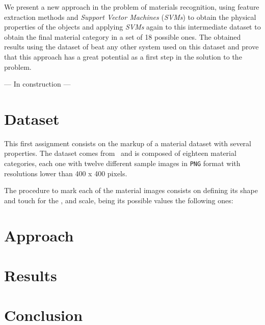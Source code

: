 \documentclass[12pt,a4paper]{article}
\begin{document}
\begin{singlespace}
We present a new approach in the problem of materials recognition, using feature extraction methods and \emph{Support Vector Machines} (\emph{SVMs}) to obtain the physical properties of the objects and applying \emph{SVMs} again to this intermediate dataset to obtain the final material category in a set of 18 possible ones. The obtained results using the dataset of \cite{Liao_2013_CVPR} beat any other system used on this dataset and prove that this approach has a great potential as a first step in the solution to the problem.

\vspace{2cm}
--- In construction ---

\section{Dataset}
This first assignment consists on the markup of a material dataset with several properties. The dataset comes from~\cite{Liao_2013_CVPR} and is composed of eighteen material categories, each one with twelve different sample images in \texttt{PNG} format with resolutions lower than 400 x 400 pixels.

The procedure to mark each of the material images consists on defining its shape and touch for the ,  and  scale, being its possible values the following ones:

\section{Approach}

\section{Results}

\section{Conclusion}

\newcommand{\Fine}{\textbf{Fine}}
\newcommand{\Medium}{\textbf{Medium}}
\newcommand{\Coarse}{\textbf{Coarse}}

\newcommand{\sfl}{\e{flat}}
\newcommand{\sro}{\e{round}}
\newcommand{\sexor}{\e{extended organized}}
\newcommand{\sexdi}{\e{extended disorganized}}

\newcommand{\tfu}{\e{furry}} 
\newcommand{\tfe}{\e{feathery}} 
\newcommand{\tco}{\e{coarse}} 
\newcommand{\tro}{\e{rough}} 
\newcommand{\tbu}{\e{bumpy}} 
\newcommand{\tsc}{\e{scratchy}} 
\newcommand{\tsm}{\e{smooth}} 
\newcommand{\tve}{\e{velvety}}


\end{singlespace}
\end{document}

